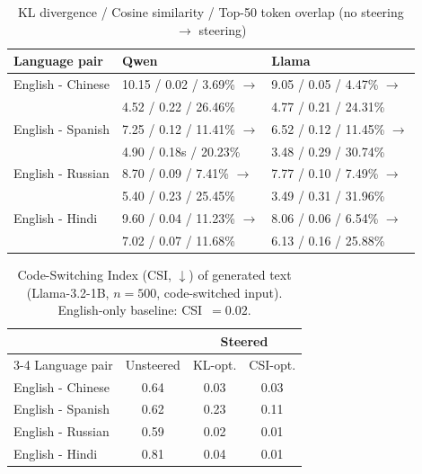 \begin{table}[h]
  \centering
  \small
  \begin{tabular}{l l l}
    \hline
    Language pair & Qwen & Llama \\
    \hline
    English - Chinese & 10.15 / 0.02 / 3.69\% $\rightarrow$   & 9.05 / 0.05 / 4.47\% $\rightarrow$  \\
    & 4.52 / 0.22 / 26.46\% & 4.77 / 0.21 / 24.31\% \\
    English - Spanish & 7.25 / 0.12 / 11.41\% $\rightarrow$ & 6.52 / 0.12 / 11.45\% $\rightarrow$  \\
    & 4.90 / 0.18s / 20.23\% & 3.48 / 0.29 / 30.74\% \\
    English - Russian & 8.70 / 0.09 / 7.41\% $\rightarrow$  & 7.77 / 0.10 / 7.49\% $\rightarrow$  \\
    &5.40 / 0.23 / 25.45\% & 3.49 / 0.31 / 31.96\% \\
    English - Hindi & 9.60 / 0.04 / 11.23\% $\rightarrow$  & 8.06 / 0.06 / 6.54\% $\rightarrow$  \\
    &7.02 / 0.07 / 11.68\% & 6.13 / 0.16 / 25.88\% \\
    \hline
  \end{tabular}
  \caption{KL divergence / Cosine similarity / Top-50 token overlap (no steering $\rightarrow$ steering)}
  \label{tab:kl_cos_overlap}
\end{table}

\begin{table}[h]
  \centering
  \small
  \begin{tabular}{l c c c}
    \hline
    & & \multicolumn{2}{c}{Steered} \\
    \cmidrule(lr){3-4}
    Language pair & Unsteered & KL-opt. & CSI-opt. \\
    \hline
    English - Chinese  & 0.64 & 0.03 & 0.03 \\
    English - Spanish  & 0.62 & 0.23 & 0.11 \\
    English - Russian  & 0.59 & 0.02 & 0.01 \\
    English - Hindi    & 0.81 & 0.04 & 0.01 \\
    \hline
  \end{tabular}
  \caption{Code-Switching Index (CSI, $\downarrow$) of generated text (Llama-3.2-1B, $n=500$, code-switched input). English-only baseline: CSI~$= 0.02$. }
  \label{tab:gen_results}
\end{table}

